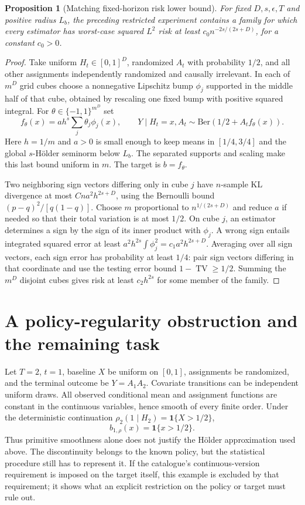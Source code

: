 \documentclass[11pt,a4paper]{article}
\newtheorem{proposition}[theorem]{Proposition}
\theoremstyle{definition}
\theoremstyle{remark}
\newcommand{\ind}{\mathbf 1}
\newcommand{\TV}{\operatorname{TV}}
\begin{document}
\begin{proposition}[Matching fixed-horizon risk lower bound]
For fixed $D,s,\epsilon,T$ and positive radius $L_b$, the preceding restricted experiment contains a family for which every estimator has worst-case squared $L^2$ risk at least $c_0 n^{-2s/(2s+D)}$, for a constant $c_0>0$.
\end{proposition}
\begin{proof}
Take uniform $H_t\in[0,1]^D$, randomized $A_t$ with probability $1/2$, and all other assignments independently randomized and causally irrelevant. In each of $m^D$ grid cubes choose a nonnegative Lipschitz bump $\phi_j$ supported in the middle half of that cube, obtained by rescaling one fixed bump with positive squared integral. For $\theta\in\{-1,1\}^{m^D}$ set
\[
 f_\theta(x)=a h^s\sum_j\theta_j\phi_j(x),\qquad
 Y\mid H_t=x,A_t\sim\mathrm{Ber}(1/2+A_t f_\theta(x)).
\]
Here $h=1/m$ and $a>0$ is small enough to keep means in $[1/4,3/4]$ and the global $s$-H\"older seminorm below $L_b$. The separated supports and scaling make this last bound uniform in $m$. The target is $b=f_\theta$.

Two neighboring sign vectors differing only in cube $j$ have $n$-sample KL divergence at most $Cna^2h^{2s+D}$, using the Bernoulli bound $(p-q)^2/[q(1-q)]$. Choose $m$ proportional to $n^{1/(2s+D)}$ and reduce $a$ if needed so that their total variation is at most $1/2$. On cube $j$, an estimator determines a sign by the sign of its inner product with $\phi_j$. A wrong sign entails integrated squared error at least $a^2h^{2s}\int\phi_j^2=c_1a^2h^{2s+D}$. Averaging over all sign vectors, each sign error has probability at least $1/4$: pair sign vectors differing in that coordinate and use the testing error bound $1-\TV\ge1/2$. Summing the $m^D$ disjoint cubes gives risk at least $c_2h^{2s}$ for some member of the family.
\end{proof}

\section{A policy-regularity obstruction and the remaining task}
Let $T=2$, $t=1$, baseline $X$ be uniform on $[0,1]$, assignments be randomized, and the terminal outcome be $Y=A_1A_2$. Covariate transitions can be independent uniform draws. All observed conditional mean and assignment functions are constant in the continuous variables, hence smooth of every finite order. Under the deterministic continuation $\rho_2(1\mid H_2)=\ind\{X>1/2\}$,
\[
 b_{1,\rho}(x)=\ind\{x>1/2\}.
\]
Thus primitive smoothness alone does not justify the H\"older approximation used above. The discontinuity belongs to the known policy, but the statistical procedure still has to represent it. If the catalogue's continuous-version requirement is imposed on the target itself, this example is excluded by that requirement; it shows what an explicit restriction on the policy or target must rule out.
\end{document}
